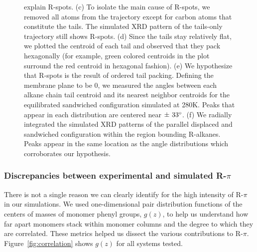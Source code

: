 \documentclass[journal=jpcbfk,manuscript=article]{achemso}
\begin{document}
\begin{figure}[!htb]
{      explain R-spots. (c) To isolate the main cause of R-spots, we removed all atoms
      from the trajectory except for carbon atoms that constitute the tails. The
      simulated XRD pattern of the tails-only trajectory still shows R-spots. (d)
      Since the tails stay relatively flat, we plotted the centroid of each tail 
      and observed that they pack hexagonally (for example, green colored centroids
      in the plot surround the red centroid in hexagonal fashion). (e) We hypothesize
      that R-spots is the result of ordered tail packing. Defining
      the membrane plane to be 0\degree, we measured the angles between each alkane 
      chain tail centroid and its nearest neighbor centroids for the equilibrated 
      sandwiched configuration simulated at 280K. Peaks that appear in each distribution
      are centered near $\pm~33\degree$. (f) We radially integrated the simulated XRD
      patterns of the parallel displaced and sandwiched configuration within the region
      bounding R-alkanes. Peaks appear in the same location as the angle distributions
      which corroborates our hypothesis.}~\label{fig:tail_packing}
  \end{figure}  
  
  \subsubsection{Discrepancies between experimental and simulated R-$\pi$}\label{section:rpi}
  
  There is not a single reason we can clearly identify for the high intensity of R-$\pi$ in our simulations.
  We used one-dimensional pair distribution functions of the centers of masses of monomer
  phenyl groups, $g(z)$, to help us understand how far apart monomers stack within monomer 
  columns and the degree to which they are correlated. These metrics helped us dissect the 
  various contributions to R-$\pi$. Figure~\ref{fig:correlation} shows $g(z)$ for all 
  systems tested. 
  
  
  
\end{document}

